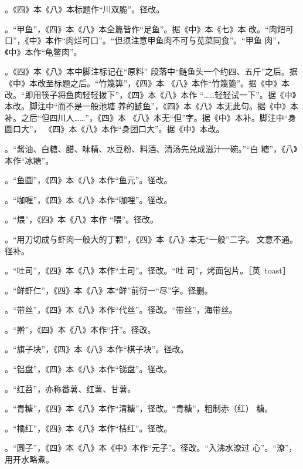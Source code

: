 。《四》本《八》本标题作“川双脆”。径改。

。“甲鱼”，《四》本《八》本全篇皆作“足鱼”。据《中》本《七》本
改。“肉𤆵可口”，《中》本作“肉烂可口”。“但须注意甲鱼肉不可与苋菜同食”。“甲鱼
肉”，《中》本作“龟鳖肉”。

。《四》本《八》本中脚注标记{\footnotesize{}}在“原料”
段落中“鲢鱼头一个约四、五斤”之后。据《中》本改至标题之后。“竹篾箅”，《四》本
《八》本作“竹篾篦”。据《中》本改。“即用筷子将鱼肉轻轻拨下”，《四》本《八》本作
“……轻轻试一下”。据《中》本改。脚注{\footnotesize{}}中“而不是一般池塘
养的鲢鱼”，《四》本《八》本无此句。据《中》本补。之后“但四川人……”，《四》本
《八》本无“但”字。据《中》本补。脚注{\footnotesize{}}中“身圆口大”，
《四》本《八》本作“身团口大”。据《中》本改。

。“酱油、白糖、醋、味精、水豆粉、料酒、清汤先兑成滋汁一碗。”“白
糖”，《八》本作“冰糖”。

。“鱼圆”，《四》本《八》本作“鱼元”。径改。

。“咖喱”，《四》本《八》本作“咖哩”。径改。

。“煨”，《四》本《八》本作
“喂”。径改。

。“用刀切成与虾肉一般大的丁颗”，《四》本《八》本无“一般”二字。
文意不通。径补。

。“吐司”，《四》本《八》本作“土司”。径改。“吐
司”，烤面包片。［英~toast］

。“鲜虾仁”，《四》本《八》本“鲜”前衍一“尽”字。径删。

。“带丝”，《四》本《八》本作“代丝”。径改。“带丝”，海带丝。

。“擀”，《四》本《八》本作“扞”。径改。

。“旗子块”，《四》本《八》本作“棋子块”。径改。

。“铝盘”，《四》本《八》本作“锑盘”。径改。

。“红苕”，亦称番薯、红薯、甘薯。

。“青糖”，《四》本《八》本作“清糖”，径改。“青糖”，粗制赤（红）
糖。

。“橘红”，《四》本《八》本作“桔红”。径改。

。“圆子”，《四》本《八》本《中》本作“元子”。径改。“入沸水潦过
心”。“潦”，用开水略煮。


